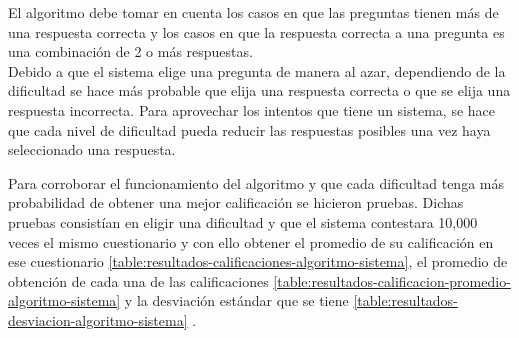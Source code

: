 \clearpage
    El algoritmo debe tomar en cuenta los casos en que las preguntas tienen más de una respuesta correcta
    y los casos en que la respuesta correcta a una pregunta es una combinación de 2 o más respuestas.\\
\clearpage
    Debido a que el sistema elige una pregunta de manera al azar,
    dependiendo de la dificultad se hace más probable que elija una respuesta correcta o que se elija una respuesta incorrecta.
\clearpage
    Para aprovechar los intentos que tiene un sistema,
    se hace que cada nivel de dificultad pueda reducir las respuestas posibles una vez haya seleccionado una respuesta.
\clearpage


\noindent Para corroborar el funcionamiento del algoritmo y que cada dificultad tenga más probabilidad de obtener una mejor calificación se hicieron pruebas.
Dichas pruebas consistían en eligir una dificultad y que el sistema contestara 10,000 veces el mismo cuestionario y con ello obtener
el promedio de su calificación en ese cuestionario \ref{table:resultados-calificaciones-algoritmo-sistema},
el promedio de obtención de cada una de las calificaciones  \ref{table:resultados-calificacion-promedio-algoritmo-sistema}
y la desviación estándar que se tiene \ref{table:resultados-desviacion-algoritmo-sistema} .



